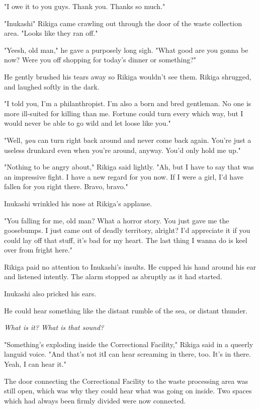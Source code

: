 "I owe it to you guys. Thank you. Thanks so much."

"Inukashi\el " Rikiga came crawling out through the door of the waste
collection area. "Looks like they ran off."

"Yeesh, old man," he gave a purposely long sigh. "What good are you
gonna be now? Were you off shopping for today's dinner or something?"

He gently brushed his tears away so Rikiga wouldn't see them. Rikiga
shrugged, and laughed softly in the dark.

"I told you, I'm a philanthropist. I'm also a born and bred gentleman.
No one is more ill-suited for killing than me. Fortune could turn every
which way, but I would never be able to go wild and let loose like you."

"Well, \emph{you} can turn right back around and never come back again. You're
just a useless drunkard even when you're around, anyway. You'd only hold
me up."

"Nothing to be angry about," Rikiga said lightly. "Ah, but I have to say
that was an impressive fight. I have a new regard for you now. If I were
a girl, I'd have fallen for you right there. Bravo, bravo."

Inukashi wrinkled his nose at Rikiga's applause.

"You falling for me, old man? What a horror story. You just gave me the
goosebumps. I just came out of deadly territory, alright? I'd appreciate
it if you could lay off that stuff, it's bad for my heart. The last
thing I wanna do is keel over from fright here."

Rikiga paid no attention to Inukashi's insults. He cupped his hand
around his ear and listened intently. The alarm stopped as abruptly as
it had started.

Inukashi also pricked his ears.

He could hear something like the distant rumble of the sea, or distant
thunder.

\emph{What is it? What is that sound?}

"Something's exploding inside the Correctional Facility," Rikiga said in
a queerly languid voice. "And that's not it\el I can hear screaming in
there, too. It's in there. Yeah, I can hear it."

The door connecting the Correctional Facility to the waste processing
area was still open, which was why they could hear what was going on
inside. Two spaces which had always been firmly divided were now
connected.

